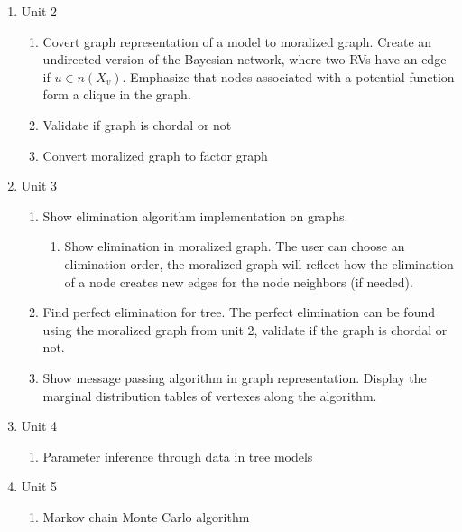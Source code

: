 \documentclass{article}
\begin{document}
\begin{enumerate}
        \pagebreak

        \item Unit 2\\
        \begin{enumerate}
            \item Covert graph representation of a model to moralized graph. Create an undirected version of the Bayesian network, where two RVs have an edge if $u \in n(X_v)$. Emphasize that nodes associated with a potential function form a clique in the graph.\\
            \item Validate if graph is chordal or not
            \item Convert moralized graph to factor graph
        \end{enumerate}
        \item Unit 3\\
        \begin{enumerate}
            \item Show elimination algorithm implementation on graphs.
            \begin{enumerate}
                \item Show elimination in moralized graph. The user can choose an elimination order, the moralized graph will reflect how the elimination of a node creates new edges for the node neighbors (if needed).
            \end{enumerate}
            \item Find perfect elimination for tree. The perfect elimination can be found using the moralized graph from unit 2, validate if the graph is chordal or not.
            \item Show message passing algorithm in graph representation. Display the marginal distribution tables of vertexes along the algorithm.
        \end{enumerate}
        \item Unit 4\\
        \begin{enumerate}
            \item Parameter inference through data in tree models
        \end{enumerate}
        \item Unit 5\\
        \begin{enumerate}
            \item Markov chain Monte Carlo algorithm
        \end{enumerate}
    \end{enumerate}
\end{document}
